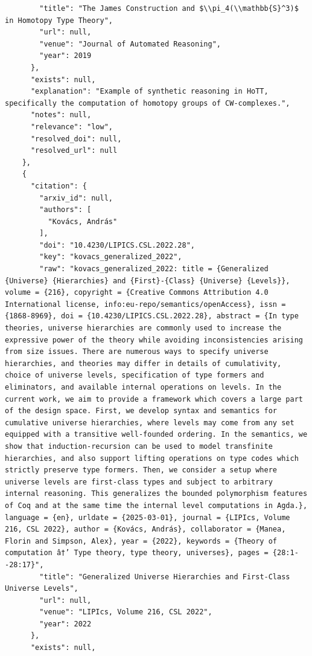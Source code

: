 \documentclass[11pt]{article}
\begin{document}
\begin{verbatim}
        "title": "The James Construction and $\\pi_4(\\mathbb{S}^3)$ in Homotopy Type Theory",
        "url": null,
        "venue": "Journal of Automated Reasoning",
        "year": 2019
      },
      "exists": null,
      "explanation": "Example of synthetic reasoning in HoTT, specifically the computation of homotopy groups of CW-complexes.",
      "notes": null,
      "relevance": "low",
      "resolved_doi": null,
      "resolved_url": null
    },
    {
      "citation": {
        "arxiv_id": null,
        "authors": [
          "Kovács, András"
        ],
        "doi": "10.4230/LIPICS.CSL.2022.28",
        "key": "kovacs_generalized_2022",
        "raw": "kovacs_generalized_2022: title = {Generalized {Universe} {Hierarchies} and {First}-{Class} {Universe} {Levels}}, volume = {216}, copyright = {Creative Commons Attribution 4.0 International license, info:eu-repo/semantics/openAccess}, issn = {1868-8969}, doi = {10.4230/LIPICS.CSL.2022.28}, abstract = {In type theories, universe hierarchies are commonly used to increase the expressive power of the theory while avoiding inconsistencies arising from size issues. There are numerous ways to specify universe hierarchies, and theories may differ in details of cumulativity, choice of universe levels, specification of type formers and eliminators, and available internal operations on levels. In the current work, we aim to provide a framework which covers a large part of the design space. First, we develop syntax and semantics for cumulative universe hierarchies, where levels may come from any set equipped with a transitive well-founded ordering. In the semantics, we show that induction-recursion can be used to model transfinite hierarchies, and also support lifting operations on type codes which strictly preserve type formers. Then, we consider a setup where universe levels are first-class types and subject to arbitrary internal reasoning. This generalizes the bounded polymorphism features of Coq and at the same time the internal level computations in Agda.}, language = {en}, urldate = {2025-03-01}, journal = {LIPIcs, Volume 216, CSL 2022}, author = {Kovács, András}, collaborator = {Manea, Florin and Simpson, Alex}, year = {2022}, keywords = {Theory of computation â†’ Type theory, type theory, universes}, pages = {28:1--28:17}",
        "title": "Generalized Universe Hierarchies and First-Class Universe Levels",
        "url": null,
        "venue": "LIPIcs, Volume 216, CSL 2022",
        "year": 2022
      },
      "exists": null,

\end{verbatim}
\end{document}
